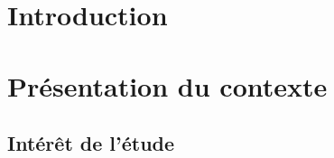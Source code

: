 \documentclass[
]{article}
\author{}
\date{\vspace{-2.5em}}
\begin{document}
\setcounter{tocdepth}{5}                
\renewcommand\contentsname{\begin{center}\textcolor{brown}{Sommaire}\end{center}}

\AtBeginShipout{
  \ifnum\value{page}=1\thispagestyle{empty}\fi}

\pagestyle{fancy}
\fancyhf{}
\renewcommand{\headrulewidth}{0.4pt}
\renewcommand{\footrulewidth}{0.4pt}
\fancyhead[R]{\textcolor{brown}{@Alex, Ali, Richard \& Toussaint}}
\fancyfoot[C]{\thepage}


\tableofcontents

\newpage

\renewcommand\listtablename{\begin{center}\textcolor{brown}{Liste des Tableaux}\end{center}}
\renewcommand\listfigurename{\begin{center}\textcolor{brown}{Liste des Figures}\end{center}} 

\setlength{\cftfignumwidth}{3em}
\setlength{\cfttabnumwidth}{3em}

\listoftables

\newpage

\listoffigures

\newpage

\hypertarget{introduction}{%
\section{Introduction}\label{introduction}}

\hypertarget{pruxe9sentation-du-contexte}{%
\section{Présentation du contexte}\label{pruxe9sentation-du-contexte}}

\hypertarget{intuxe9ruxeat-de-luxe9tude}{%
\subsection{Intérêt de l'étude}\label{intuxe9ruxeat-de-luxe9tude}}
\end{document}
